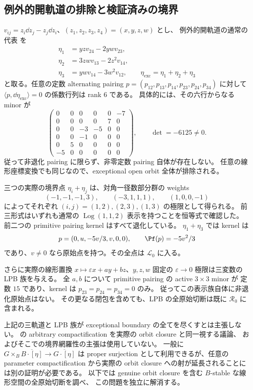 \subsection{例外的開軌道の排除と検証済みの境界}

$v_{ij}=z_i\dd z_j-z_j\dd z_i$、$(z_1,z_2,z_3,z_4)=(x,y,z,w)$ とし、
例外的開軌道の通常の代表 \cite[\S3]{AC26} を
\[
\begin{split}
 \eta_1&=yzv_{24}-2ywv_{23},\\
 \eta_2&=3zwv_{13}-2z^2v_{14},\\
 \eta_3&=ywv_{14}-3w^2v_{12},\qquad
 \eta_{\mathrm{exc}}=\eta_1+\eta_2+\eta_3
\end{split}\tag{Z11}
\]
と取る。任意の定数 alternating pairing
$p=(p_{12},p_{13},p_{14},p_{23},p_{24},p_{34})$ に対して
$\langle p,\dd\eta_{\mathrm{exc}}\rangle=0$ の係数行列は rank $6$ である。
具体的には、その六行からなる minor が
\[
 \begin{pmatrix}
 0&0&0&0&0&-7\\
 0&0&0&0&7&0\\
 0&0&-3&-5&0&0\\
 0&0&-1&0&0&0\\
 0&5&0&0&0&0\\
 -5&0&0&0&0&0
 \end{pmatrix},\qquad \det=-6125\ne0.                       \tag{Z12}
\]
従って非退化 pairing に限らず、非零定数 pairing 自体が存在しない。
任意の線形座標変換でも同じなので、exceptional open orbit 全体が排除される。

三つの実際の境界点 $\eta_i+\eta_j$ は、対角一径数部分群の weights
\[
 (-1,-1,-1,3),\qquad(-3,1,1,1),\qquad(1,0,0,-1)
\]
によってそれぞれ $(i,j)=(1,2),(2,3),(1,3)$ の極限として得られる。
前三形式はいずれも通常の $\operatorname{Log}(1,1,2)$ 表示を持つことを恒等式で確認した。
前二つの primitive pairing kernel はすべて退化している。
$\eta_1+\eta_3$ では kernel は
\[
 p=(0,u,-5v/3,v,0,0),\qquad \Pf(p)=-5v^2/3
\]
であり、$v\ne0$ なら原始点を持つ。その全点は $\mathcal L_0$ に入る。

さらに実際の線形置換 $x\mapsto\varepsilon x+ay+bz$、$y,z,w$ 固定の
$\varepsilon\to0$ 極限は三変数の LPB 族を与える。
全 $a,b$ について primitive pairing の active $3\times3$ minor が
定数 $15$ であり、kernel は $p_{23}=p_{24}=p_{34}=0$ のみ。
従ってこの表示族自体に非退化原始点はない。
その更なる閉包を含めても、LPB の全原始切断は既に $\mathcal R_0$ に含まれる。

\begin{remark}[外部の境界網羅性を使用しない]
上記の三軌道と LPB 族が exceptional boundary の全てを尽くすとは主張しない。
\cite{AC26} の arbitrary compactification を実際の orbit closure と同一視する議論、
およびそこでの境界網羅性の主張は使用していない。
一般に $G\times_B\overline{B\cdot[\eta]}\to\overline{G\cdot[\eta]}$ は proper surjection
として利用できるが、任意の parameter compactification から実際の orbit closure
への射が延長されることには別の証明が必要である。
以下では genuine orbit closure を含む $B$-stable な線形空間の全原始切断を調べ、
この問題を独立に解消する。
\end{remark}

